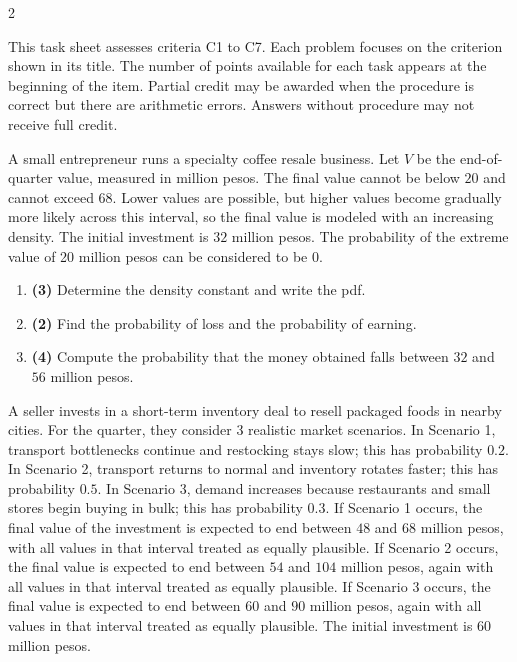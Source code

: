 	\begin{multicols}{2}
		
		\vspace{-0.3cm}
		This task sheet assesses criteria C1 to C7. Each problem focuses on the criterion shown in its title. The number of points available for each task appears at the beginning of the item. Partial credit may be awarded when the procedure is correct but there are arithmetic errors. Answers without procedure may not receive full credit.
		
		\vspace{0.25cm}
		\vspace{-0.3cm}
		A small entrepreneur runs a specialty coffee resale business. Let $V$ be the end-of-quarter value, measured in million pesos. The final value cannot be below $20$ and cannot exceed $68$. Lower values are possible, but higher values become gradually more likely across this interval, so the final value is modeled with an increasing density. The initial investment is $32$ million pesos. The probability of the extreme value of 20 million pesos can be considered to be 0.
		
		
		\begin{enumerate}[label=\textbf{\alph*)}]
			\item \textbf{(3)} Determine the density constant and write the pdf.
			\item \textbf{(2)} Find the probability of loss and the probability of earning.
			\item \textbf{(4)} Compute the probability that the money obtained falls between \(32\) and \(56\) million pesos.
		\end{enumerate}
		
		\vspace{0.25cm}
		\vspace{-0.3cm}
		A seller invests in a short-term inventory deal to resell packaged foods in nearby cities. For the quarter, they consider 3 realistic market scenarios. In Scenario 1, transport bottlenecks continue and restocking stays slow; this has probability $0.2$. In Scenario 2, transport returns to normal and inventory rotates faster; this has probability $0.5$. In Scenario 3, demand increases because restaurants and small stores begin buying in bulk; this has probability $0.3$. If Scenario 1 occurs, the final value of the investment is expected to end between $48$ and $68$ million pesos, with all values in that interval treated as equally plausible. If Scenario 2 occurs, the final value is expected to end between $54$ and $104$ million pesos, again with all values in that interval treated as equally plausible. If Scenario 3 occurs, the final value is expected to end between $60$ and $90$ million pesos, again with all values in that interval treated as equally plausible. The initial investment is $60$ million pesos.
		

\end{multicols}
